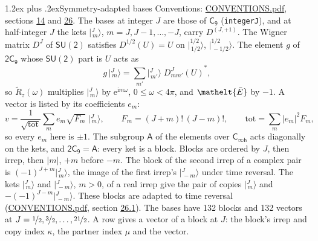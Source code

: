 \documentclass[10pt,a4paper]{article}
\makeatletter
\renewcommand\section{\@startsection{section}{1}{\z@}{-3ex plus -1ex minus -.2ex}%
  {1.2ex plus .2ex}{\normalfont\large\sffamily\bfseries\color{parttitle}}}
\numberwithin{equation}{section}
\newcommand{\eltfont}[1]{{\let\sigma\eltsigma\mathelt{#1}}}
\newcommand{\grp}[1]{\mathsf{#1}}
\newcommand{\elt}[1]{\eltfont{#1}}
\newcommand{\iunit}{\mathrm{i}}
\newcommand{\expe}{\mathrm{e}}
\newcommand{\irrJp}[2]{D^{(#1,#2)}}
\newcommand{\wignerD}[1]{D^{#1}}
\newcommand{\conj}[1]{{#1}^{*}}
\newcommand{\mult}{\kappa}
\newcommand{\intx}{\mu}
\newcommand{\jm}[2]{\bigl\lvert{}^{#1}_{\,#2}\bigr\rangle}
\newcommand{\barred}[1]{\bar{#1}}
\newcommand{\lift}[1]{\tilde{#1}}
\makeatother
\begin{document}
\section{Symmetry-adapted bases}\label{s:bases}
Conventions: \href{../../CONVENTIONS.pdf}{CONVENTIONS.pdf}, sections \href{../../../rotation/CONVENTIONS.pdf\#conv.14}{14} and \href{../../CONVENTIONS.pdf\#conv.26}{26}.
\leavevmode\label{n:index.m}\label{n:vector.ket}The bases at integer $J$ are those of \href{../../../rotation/data/pdf/C9.pdf}{$\grp{C_{9}}$} (\texttt{integerJ}), and at half-integer $J$ the kets $\jm{J}{m}$, $m = J, J-1, \dots, -J$, carry $\irrJp{J}{+1}$. \label{n:matrix.wigner}The Wigner matrix $\wignerD{J}$ of $\grp{SU(2)}$ satisfies $\wignerD{1/2}(U) = U$ on $\jm{1/2}{1/2}$, $\jm{1/2}{-1/2}$. The element $g$ of $\grp{2C_{9}}$ whose $\grp{SU(2)}$ part is $U$ acts as
\begin{equation}\label{e:action}g\,\jm{J}{m} = \sum_{m'} \jm{J}{m'}\; \conj{\wignerD{J}_{m m'}(U)},\end{equation}
so $\lift{R}_{z}(\omega)$ multiplies $\jm{J}{m}$ by $\expe^{\iunit m\omega}$, $0 \le \omega < 4\pi$, and $\elt{\barred{E}}$ by $-1$. \label{n:index.ketcoefficient}\label{n:vector.basis.symmetry}\label{n:index.ketweight}\label{n:index.total}A vector is listed by its coefficients $e_m$:
\begin{equation}\label{e:ket}v = \frac{1}{\sqrt{\mathrm{tot}}}\sum_m e_m\sqrt{F_m}\;\jm{J}{m},\qquad F_m = (J+m)!\,(J-m)!,\qquad \mathrm{tot} = \sum_m |e_m|^2F_m,\end{equation}
so every $e_m$ here is $\pm 1$.
\leavevmode\label{n:group.A}The subgroup $\grp{A}$ of the elements over $\grp{C_{\infty h}}$ acts diagonally on the kets, and $\grp{2C_{9}} = \grp{A}$: every ket is a block. Blocks are ordered by $J$, then irrep, then $|m|$, $+m$ before $-m$. The block of the second irrep of a complex pair is $(-1)^{J+m}\jm{J}{m}$, the image of the first irrep's $\jm{J}{-m}$ under time reversal. The kets $\jm{J}{m}$ and $\jm{J}{-m}$, $m > 0$, of a real irrep give the pair of copies $\jm{J}{m}$ and $-(-1)^{J-m}\jm{J}{-m}$. These blocks are adapted to time reversal (\href{../../CONVENTIONS.pdf}{CONVENTIONS.pdf}, section \href{../../CONVENTIONS.pdf\#conv.26.1}{26.1}).
The bases have 132 blocks and 132 vectors at $J = \nicefrac{1}{2}, \nicefrac{3}{2}, \dots, \nicefrac{21}{2}$. \label{n:index.copy}\label{n:head.vector}A row gives a vector of a block at $J$: the block's irrep and copy index $\mult$, the partner index $\intx$ and the vector.
\end{document}
